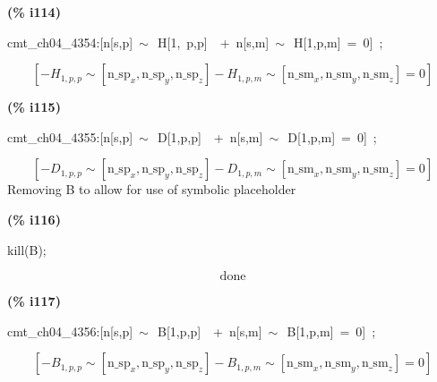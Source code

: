 \documentclass[fleqn]{article}
\begin{document}
\noindent
\begin{minipage}[t]{4.000000em}\color{red}\bfseries
(\% i114)	
\end{minipage}
\begin{minipage}[t]{\textwidth}\color{blue}
cmt\_ch04\_4354:[n[s,p]\ \ensuremath{\sim\ }\ H[1,\ p,p]\ \ +\ n[s,m]\ \ensuremath{\sim\ }\ H[1,p,m]\ =\ 0]\ ;
\end{minipage}
\[\displaystyle \tag{\% o114} 
\left[ -{H_{1,p,p}}\operatorname{\sim  }\left[ {{\ensuremath{\mathrm{n\_ sp}}}_x}\operatorname{,}{{\ensuremath{\mathrm{n\_ sp}}}_y}\operatorname{,}{{\ensuremath{\mathrm{n\_ sp}}}_z}\right] -{H_{1,p,m}}\operatorname{\sim  }\left[ {{\ensuremath{\mathrm{n\_ sm}}}_x}\operatorname{,}{{\ensuremath{\mathrm{n\_ sm}}}_y}\operatorname{,}{{\ensuremath{\mathrm{n\_ sm}}}_z}\right] =0\right] \mbox{}
\]


\noindent
\begin{minipage}[t]{4.000000em}\color{red}\bfseries
(\% i115)	
\end{minipage}
\begin{minipage}[t]{\textwidth}\color{blue}
cmt\_ch04\_4355:[n[s,p]\ \ensuremath{\sim\ }\ D[1,p,p]\ \ +\ n[s,m]\ \ensuremath{\sim\ }\ D[1,p,m]\ =\ 0]\ ;
\end{minipage}
\[\displaystyle \tag{\% o115} 
\left[ -{D_{1,p,p}}\operatorname{\sim  }\left[ {{\ensuremath{\mathrm{n\_ sp}}}_x}\operatorname{,}{{\ensuremath{\mathrm{n\_ sp}}}_y}\operatorname{,}{{\ensuremath{\mathrm{n\_ sp}}}_z}\right] -{D_{1,p,m}}\operatorname{\sim  }\left[ {{\ensuremath{\mathrm{n\_ sm}}}_x}\operatorname{,}{{\ensuremath{\mathrm{n\_ sm}}}_y}\operatorname{,}{{\ensuremath{\mathrm{n\_ sm}}}_z}\right] =0\right] \mbox{}
\]
Removing B to allow for use of symbolic placeholder


\noindent
\begin{minipage}[t]{4.000000em}\color{red}\bfseries
(\% i116)	
\end{minipage}
\begin{minipage}[t]{\textwidth}\color{blue}
kill(B);
\end{minipage}
\[\displaystyle \tag{\% o116} 
\ensuremath{\mathrm{done}}\mbox{}
\]


\noindent
\begin{minipage}[t]{4.000000em}\color{red}\bfseries
(\% i117)	
\end{minipage}
\begin{minipage}[t]{\textwidth}\color{blue}
cmt\_ch04\_4356:[n[s,p]\ \ensuremath{\sim\ }\ B[1,p,p]\ \ +\ n[s,m]\ \ensuremath{\sim\ }\ B[1,p,m]\ =\ 0]\ ;
\end{minipage}
\[\displaystyle \tag{\% o117} 
\left[ -{B_{1,p,p}}\operatorname{\sim  }\left[ {{\ensuremath{\mathrm{n\_ sp}}}_x}\operatorname{,}{{\ensuremath{\mathrm{n\_ sp}}}_y}\operatorname{,}{{\ensuremath{\mathrm{n\_ sp}}}_z}\right] -{B_{1,p,m}}\operatorname{\sim  }\left[ {{\ensuremath{\mathrm{n\_ sm}}}_x}\operatorname{,}{{\ensuremath{\mathrm{n\_ sm}}}_y}\operatorname{,}{{\ensuremath{\mathrm{n\_ sm}}}_z}\right] =0\right] \mbox{}
\]
\end{document}

